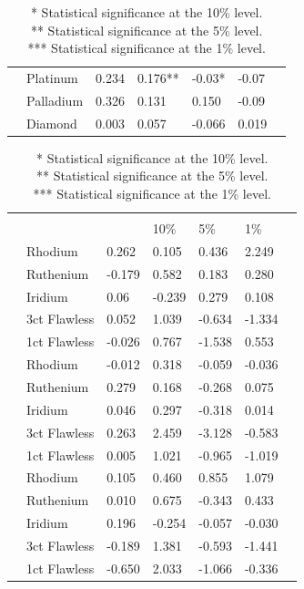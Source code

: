 \documentclass[preprint,authoryear,11pt]{elsarticle}
\begin{document}
\begin{table}[htp!]
\begin{tabularx}{\linewidth}{*{6}{>{\arraybackslash\small}p{.14\linewidth}}S[table-format=1.3]}
		                            & Platinum & 0.234 & 0.176** & -0.03* & -0.07 \\
		                            & Palladium & 0.326 & 0.131 & 0.150 & -0.09 \\
		                            & Diamond & 0.003 & 0.057 & -0.066 & 0.019\\
		\hline
	\end{tabularx}
	\caption*{\newline
	*   Statistical significance at the 10\% level.\\
	**  Statistical significance at the 5\% level.\\
	*** Statistical significance at the 1\% level.}
\end{table}
\begin{table}[htp!]
	\caption{\newline }
	\label{}
	\renewcommand\arraystretch{0.65}
	\begin{tabularx}{\linewidth}{*{6}{>{\arraybackslash\small}p{.14\linewidth}}S[table-format=1.3]}
		\hline
		&     &   &  \\
		&    &        & 10\% & 5\% & 1\% \\
		\hline
		 & Rhodium  & 0.262 & 0.105 & 0.436 & 2.249 \\
										& Ruthenium & -0.179 & 0.582 & 0.183 & 0.280 \\
										& Iridium & 0.06 & -0.239 & 0.279 & 0.108 \\
										& 3ct Flawless & 0.052 & 1.039 & -0.634 & -1.334 \\
										& 1ct Flawless & -0.026 & 0.767 & -1.538 & 0.553\\
		\hline
		  & Rhodium     & -0.012 & 0.318  & -0.059 & -0.036 \\
									& Ruthenium     & 0.279  & 0.168  & -0.268 & 0.075 \\
									& Iridium   & 0.046 & 0.297 & -0.318 & 0.014 \\
									& 3ct Flawless  & 0.263 & 2.459 & -3.128 & -0.583 \\
									& 1ct Flawless  & 0.005 & 1.021 & -0.965 & -1.019 \\
		\hline
		 & Rhodium & 0.105 & 0.460 & 0.855 & 1.079 \\
									& Ruthenium & 0.010 & 0.675 & -0.343 & 0.433 \\
									& Iridium & 0.196 & -0.254 & -0.057 & -0.030 \\
									& 3ct Flawless & -0.189 & 1.381 & -0.593 & -1.441\\
									& 1ct Flawless & -0.650 & 2.033 & -1.066 & -0.336 \\
		\hline
	\end{tabularx}
	\caption*{\newline
		*   Statistical significance at the 10\% level.\\
		**  Statistical significance at the 5\% level.\\
		*** Statistical significance at the 1\% level.}
\end{table}
\end{document}
